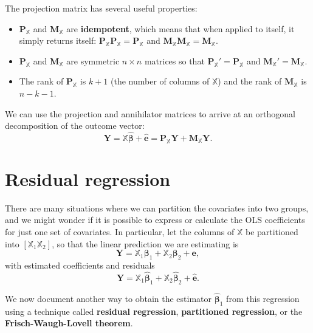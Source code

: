 \documentclass[
  13pt,
  letterpaper,
  DIV=11,
  numbers=noendperiod]{scrreprt}
\newcommand{\mb}{\symbf}
\newcommand{\Xmat}{\mathbb{X}}
\newcommand{\bfbeta}{\mb{\beta}}
\newcommand{\bhat}{\widehat{\mb{\beta}}}
\theoremstyle{definition}
\theoremstyle{definition}
\theoremstyle{plain}
\theoremstyle{remark}
\begin{document}
The projection matrix has several useful properties:

\begin{itemize}
\item
  \(\mb{P}_{\Xmat}\) and \(\mb{M}_{\Xmat}\) are \textbf{idempotent},
  which means that when applied to itself, it simply returns itself:
  \(\mb{P}_{\Xmat}\mb{P}_{\Xmat} = \mb{P}_{\Xmat}\) and
  \(\mb{M}_{\Xmat}\mb{M}_{\Xmat} = \mb{M}_{\Xmat}\).
\item
  \(\mb{P}_{\Xmat}\) and \(\mb{M}_{\Xmat}\) are symmetric \(n \times n\)
  matrices so that \(\mb{P}_{\Xmat}' = \mb{P}_{\Xmat}\) and
  \(\mb{M}_{\Xmat}' = \mb{M}_{\Xmat}\).
\item
  The rank of \(\mb{P}_{\Xmat}\) is \(k+1\) (the number of columns of
  \(\Xmat\)) and the rank of \(\mb{M}_{\Xmat}\) is \(n - k - 1\).
\end{itemize}

We can use the projection and annihilator matrices to arrive at an
orthogonal decomposition of the outcome vector: \[ 
\mb{Y} = \Xmat\bhat + \widehat{\mb{e}} = \mb{P}_{\Xmat}\mb{Y} + \mb{M}_{\Xmat}\mb{Y}.
\]

\section{Residual regression}\label{residual-regression}

There are many situations where we can partition the covariates into two
groups, and we might wonder if it is possible to express or calculate
the OLS coefficients for just one set of covariates. In particular, let
the columns of \(\Xmat\) be partitioned into \([\Xmat_{1} \Xmat_{2}]\),
so that the linear prediction we are estimating is \[ 
\mb{Y} = \Xmat_{1}\bfbeta_{1} + \Xmat_{2}\bfbeta_{2} + \mb{e}, 
\] with estimated coefficients and residuals \[ 
\mb{Y} = \Xmat_{1}\bhat_{1} + \Xmat_{2}\bhat_{2} + \widehat{\mb{e}}.
\]

We now document another way to obtain the estimator \(\bhat_1\) from
this regression using a technique called \textbf{residual regression},
\textbf{partitioned regression}, or the \textbf{Frisch-Waugh-Lovell
theorem}.
\end{document}
